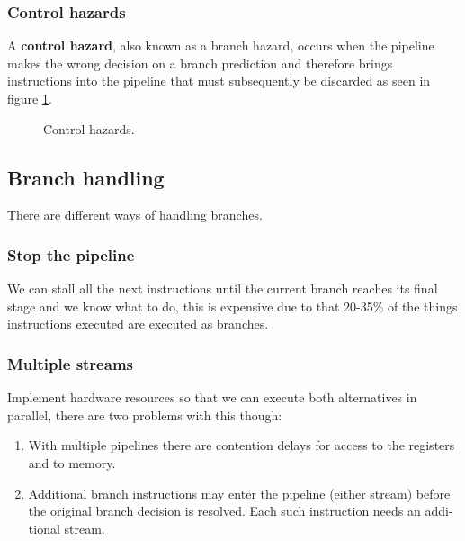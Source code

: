 \subsubsection{Control hazards}
A \textbf{control hazard}, also known as a branch hazard, occurs when the pipeline makes the wrong decision on a branch prediction and therefore brings instructions into the pipeline that must subsequently be discarded as seen in figure \ref{fig:control-hazard}.

\begin{figure}[H]
	\centering
	\caption{Control hazards.}
	\label{fig:control-hazard}
\end{figure}


\subsection{Branch handling}
There are different ways of handling branches. \\

\subsubsection{Stop the pipeline}
We can stall all the next instructions until the current branch reaches its final stage and we know what to do, this is expensive due to that 20-35\% of the things instructions executed are executed as branches.

\subsubsection{Multiple streams}
Implement hardware resources so that we can execute both alternatives in parallel, there are two problems with this though:
\begin{enumerate}
\item With multiple pipelines there are contention delays for access to the registers and to memory. \\
\item Additional branch instructions may enter the pipeline (either stream) before the original branch decision is resolved. Each such instruction needs an addi- tional stream.
\end{enumerate}

